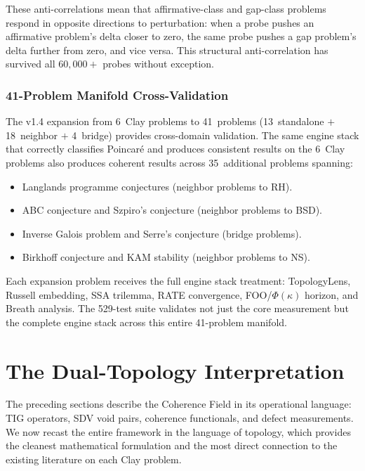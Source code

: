 \documentclass[11pt]{article}
\begin{document}
\noindent
These anti-correlations mean that affirmative-class and gap-class problems
respond in opposite directions to perturbation: when a probe pushes an
affirmative problem's delta closer to zero, the same probe pushes a
gap problem's delta further from zero, and vice versa.  This structural
anti-correlation has survived all $60{,}000{+}$ probes without exception.

\subsubsection{41-Problem Manifold Cross-Validation}

The v1.4 expansion from 6~Clay problems to 41~problems
(13~standalone $+$ 18~neighbor $+$ 4~bridge) provides cross-domain
validation.  The same engine stack that correctly classifies Poincar\'e
and produces consistent results on the 6~Clay problems also produces
coherent results across 35~additional problems spanning:
\begin{itemize}
\item Langlands programme conjectures (neighbor problems to RH).
\item ABC conjecture and Szpiro's conjecture (neighbor problems to BSD).
\item Inverse Galois problem and Serre's conjecture (bridge problems).
\item Birkhoff conjecture and KAM stability (neighbor problems to NS).
\end{itemize}

\noindent
Each expansion problem receives the full engine stack treatment:
TopologyLens, Russell embedding, SSA trilemma, RATE convergence,
FOO/$\Phi(\kappa)$ horizon, and Breath analysis.  The 529-test suite
validates not just the core measurement but the complete engine stack
across this entire 41-problem manifold.

\section{The Dual-Topology Interpretation}
\label{sec:topology}

The preceding sections describe the Coherence Field in its operational
language: TIG operators, SDV void pairs, coherence functionals, and defect
measurements.  We now recast the entire framework in the language of topology,
which provides the cleanest mathematical formulation and the most direct
connection to the existing literature on each Clay problem.
\end{document}

